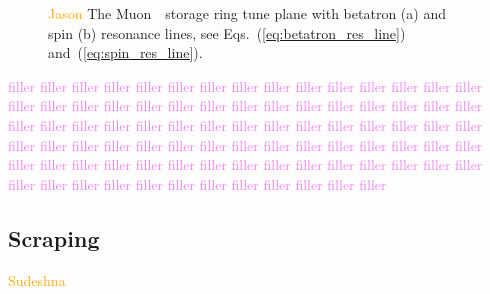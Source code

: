 \begin{figure}[]
	\centering
	\begin{subfigure}{\columnwidth}
		\caption{}\label{fig:betatron_tune_plane}
	\end{subfigure}
	\begin{subfigure}{\columnwidth}
		\caption{}\label{fig:spin_tune_plane}
	\end{subfigure}
	\caption{\textcolor{orange}{Jason} The Muon~\gmtwo~storage ring tune plane with betatron (a) and spin (b) resonance lines, see Eqs.~(\ref{eq:betatron_res_line}) and~(\ref{eq:spin_res_line}). }\label{fig:tune_plane}
\end{figure}

\textcolor{violet}{filler filler filler filler filler filler filler filler filler filler filler filler filler filler filler filler filler filler filler filler filler filler filler filler filler filler filler filler filler filler filler filler filler filler filler filler filler filler filler filler filler filler filler filler filler filler filler filler filler filler filler filler filler filler filler filler filler filler filler filler filler filler filler filler filler filler filler filler filler filler filler filler filler filler filler filler filler filler filler filler filler filler filler filler filler filler filler}

\subsection{\label{sec:scraping} Scraping}
\textcolor{orange}{Sudeshna}
\medskip

